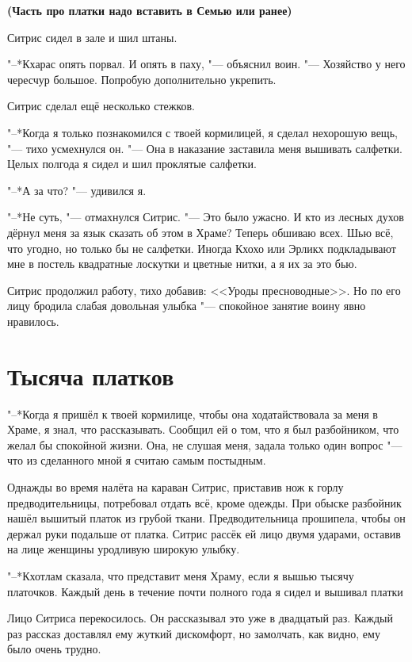 \documentclass[a4paper,10pt,fleqn]{book}
\newcommand{\ldotst}{\so{...}\xspace}
\begin{document}
\textbf{(Часть про платки надо вставить в Семью или ранее)}

Ситрис сидел в зале и шил штаны.

"--*Кхарас опять порвал.
И опять в паху, "--- объяснил воин.
"--- Хозяйство у него чересчур большое.
Попробую дополнительно укрепить.

Ситрис сделал ещё несколько стежков.

"--*Когда я\ldotst только познакомился с твоей кормилицей, я сделал нехорошую вещь, "--- тихо усмехнулся он.
"--- Она в наказание заставила меня вышивать салфетки.
Целых полгода я сидел и шил проклятые салфетки.

"--*А за что? "--- удивился я.

"--*Не суть, "--- отмахнулся Ситрис.
"--- Это было ужасно.
И кто из лесных духов дёрнул меня за язык сказать об этом в Храме?
Теперь обшиваю всех.
Шью всё, что угодно, но только бы не салфетки.
Иногда Кхохо или Эрликх подкладывают мне в постель квадратные лоскутки и цветные нитки, а я их за это бью.

Ситрис продолжил работу, тихо добавив: <<Уроды пресноводные>>.
Но по его лицу бродила слабая довольная улыбка "--- спокойное занятие воину явно нравилось.

\section{Тысяча платков}

"--*Когда я пришёл к твоей кормилице, чтобы она ходатайствовала за меня в Храме, я знал, что рассказывать.
Сообщил ей о том, что я был разбойником, что желал бы спокойной жизни.
Она, не слушая меня, задала только один вопрос "--- что из сделанного мной я считаю самым постыдным.

Однажды во время налёта на караван Ситрис, приставив нож к горлу предводительницы, потребовал отдать всё, кроме одежды.
При обыске разбойник нашёл вышитый платок из грубой ткани.
Предводительница прошипела, чтобы он держал руки подальше от платка.
Ситрис рассёк ей лицо двумя ударами, оставив на лице женщины уродливую широкую улыбку.

"--*Кхотлам сказала, что представит меня Храму, если я вышью тысячу платочков.
Каждый день в течение почти полного года я сидел и вышивал платки\ldotst

Лицо Ситриса перекосилось.
Он рассказывал это уже в двадцатый раз.
Каждый раз рассказ доставлял ему жуткий дискомфорт, но замолчать, как видно, ему было очень трудно.
\end{document}
